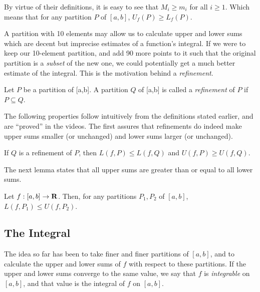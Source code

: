 \documentclass{article}
\begin{document}
      \begin{remark}
        By virtue of their definitions, it is easy to see that \(M_i \geq m_i\) for all \(i \geq 1\). Which means that for any partition \(P\) of \([a,b]\), \(U_f(P) \geq L_f(P)\).
      \end{remark}

      A partition with 10 elements may allow us to calculate upper and lower sums which are decent but imprecise estimates of a function's integral. If we were to keep our 10-element partition, and add 90 more points to it such that the original partition is a \emph{subset} of the new one, we could potentially get a much better estimate of the integral. This is the motivation behind a \emph{refinement}.

      \begin{defi}[Refinements]
        Let \(P\) be a partition of [a,b]. A partition \(Q\) of [a,b] is called a \emph{refinement} of \(P\) if \(P \subseteq Q\).
      \end{defi}

      The following properties follow intuitively from the definitions stated earlier, and are ``proved'' in the videos. The first assures that refinements do indeed make upper sums smaller (or unchanged) and lower sums larger (or unchanged).
      
      \begin{lemma}
        If \(Q\) is a refinement of \(P\), then \(L(f,P) \leq L(f,Q)\) and \(U(f,P) \geq U(f,Q)\).
      \end{lemma}

      The next lemma states that all upper sums are greater than or equal to all lower sums. 

      \begin{lemma}
        Let \(f:[a,b] \to \mathbf{R}\). Then, for any partitions \(P_1, P_2\) of \([a,b]\), \(L(f,P_1) \leq U(f,P_2)\).
      \end{lemma}




  \subsection{The Integral}
  The idea so far has been to take finer and finer partitions of \([a,b]\), and to calculate the upper and lower sums of \(f\) with respect to these partitions. If the upper and lower sums converge to the same value, we say that \(f\) is \emph{integrable} on \([a,b]\), and that value is the integral of \(f\) on \([a,b]\).
\end{document}
